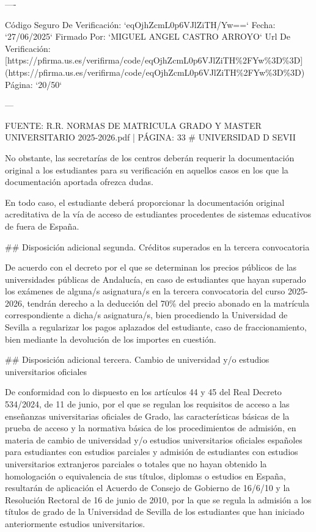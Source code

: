 \documentclass{article}
\begin{document}
\begin{itemize}
\begin{itemize}
\begin{scriptsize}
                  ----

                  Código Seguro De Verificación: `eqOjhZcmL0p6VJlZiTH/Yw==`
                  Fecha: `27/06/2025`
                  Firmado Por: `MIGUEL ANGEL CASTRO ARROYO`
                  Url De Verificación: [https://pfirma.us.es/verifirma/code/eqOjhZcmL0p6VJlZiTH\%2FYw\%3D\%3D](https://pfirma.us.es/verifirma/code/eqOjhZcmL0p6VJlZiTH\%2FYw\%3D\%3D)
                  Página: `20/50`

                  ---

                  FUENTE: R.R. NORMAS DE MATRICULA GRADO Y MASTER UNIVERSITARIO 2025-2026.pdf | PÁGINA: 33
                  \# UNIVERSIDAD D SEVII

                  No obstante, las secretarías de los centros deberán requerir la documentación original a los estudiantes para su verificación en aquellos casos en los que la documentación aportada ofrezca dudas.

                  En todo caso, el estudiante deberá proporcionar la documentación original acreditativa de la vía de acceso de estudiantes procedentes de sistemas educativos de fuera de España.

                  \#\# Disposición adicional segunda. Créditos superados en la tercera convocatoria

                  De acuerdo con el decreto por el que se determinan los precios públicos de las universidades públicas de Andalucía, en caso de estudiantes que hayan superado los exámenes de alguna/s asignatura/s en la tercera convocatoria del curso 2025-2026, tendrán derecho a la deducción del 70\% del precio abonado en la matrícula correspondiente a dicha/s asignatura/s, bien procediendo la Universidad de Sevilla a regularizar los pagos aplazados del estudiante, caso de fraccionamiento, bien mediante la devolución de los importes en cuestión.

                  \#\# Disposición adicional tercera. Cambio de universidad y/o estudios universitarios oficiales

                  De conformidad con lo dispuesto en los artículos 44 y 45 del Real Decreto 534/2024, de 11 de junio, por el que se regulan los requisitos de acceso a las enseñanzas universitarias oficiales de Grado, las características básicas de la prueba de acceso y la normativa básica de los procedimientos de admisión, en materia de cambio de universidad y/o estudios universitarios oficiales españoles para estudiantes con estudios parciales y admisión de estudiantes con estudios universitarios extranjeros parciales o totales que no hayan obtenido la homologación o equivalencia de sus títulos, diplomas o estudios en España, resultarán de aplicación el Acuerdo de Consejo de Gobierno de 16/6/10 y la Resolución Rectoral de 16 de junio de 2010, por la que se regula la admisión a los títulos de grado de la Universidad de Sevilla de los estudiantes que han iniciado anteriormente estudios universitarios.


\end{scriptsize}
\end{itemize}
\end{itemize}
\end{document}
